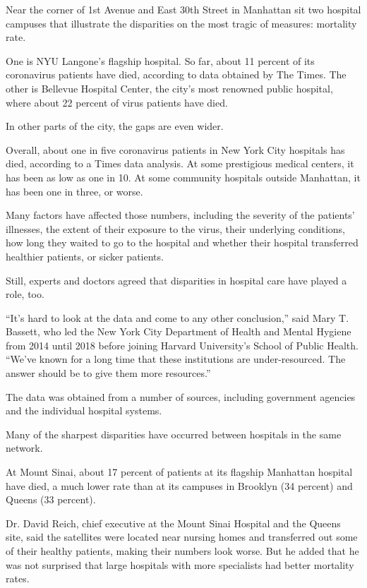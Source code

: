 Near the corner of 1st Avenue and East 30th Street in Manhattan sit two
hospital campuses that illustrate the disparities on the most tragic of
measures: mortality rate.

One is NYU Langone's flagship hospital. So far, about 11 percent of its
coronavirus patients have died, according to data obtained by The Times.
The other is Bellevue Hospital Center, the city's most renowned public
hospital, where about 22 percent of virus patients have died.

In other parts of the city, the gaps are even wider.

Overall, about one in five coronavirus patients in New York City
hospitals has died, according to a Times data analysis. At some
prestigious medical centers, it has been as low as one in 10. At some
community hospitals outside Manhattan, it has been one in three, or
worse.

Many factors have affected those numbers, including the severity of the
patients' illnesses, the extent of their exposure to the virus, their
underlying conditions, how long they waited to go to the hospital and
whether their hospital transferred healthier patients, or sicker
patients.

Still, experts and doctors agreed that disparities in hospital care have
played a role, too.

``It's hard to look at the data and come to any other conclusion,'' said
Mary T. Bassett, who led the New York City Department of Health and
Mental Hygiene from 2014 until 2018 before joining Harvard University's
School of Public Health. ``We've known for a long time that these
institutions are under-resourced. The answer should be to give them more
resources.''

The data was obtained from a number of sources, including government
agencies and the individual hospital systems.

Many of the sharpest disparities have occurred between hospitals in the
same network.

At Mount Sinai, about 17 percent of patients at its flagship Manhattan
hospital have died, a much lower rate than at its campuses in Brooklyn
(34 percent) and Queens (33 percent).

Dr. David Reich, chief executive at the Mount Sinai Hospital and the
Queens site, said the satellites were located near nursing homes and
transferred out some of their healthy patients, making their numbers
look worse. But he added that he was not surprised that large hospitals
with more specialists had better mortality rates.


